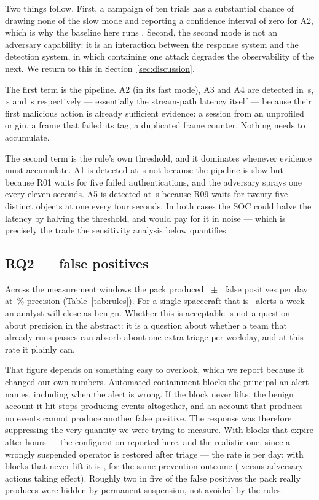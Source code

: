 Two things follow. First, a campaign of ten trials has a substantial chance of
drawing none of the slow mode and reporting a confidence interval of zero for A2,
which is why the baseline here runs \ResTrials{}. Second, the second mode is not
an adversary capability: it is an interaction between the response system and the
detection system, in which containing one attack degrades the observability of
the next. We return to this in Section~\ref{sec:discussion}.

The first term is the pipeline. A2 (in its fast mode), A3 and A4 are detected in
\ResTTDMedianAtwo{}\,s, \ResTTDAthree{}\,s and \ResTTDAfour{}\,s respectively ---
essentially the stream-path latency itself --- because their first malicious
action is already sufficient evidence: a session from an unprofiled origin, a
frame that failed its tag, a duplicated frame counter. Nothing needs to
accumulate.

The second term is the rule's own threshold, and it dominates whenever evidence
must accumulate. A1 is detected at \ResTTDAone{}\,s not because the pipeline is
slow but because R01 waits for five failed authentications, and the adversary
sprays one every eleven seconds. A5 is detected at \ResTTDAfive{}\,s because R09
waits for twenty-five distinct objects at one every four seconds. In both cases
the SOC could halve the latency by halving the threshold, and would pay for it in
noise --- which is precisely the trade the sensitivity analysis below quantifies.

\subsection{RQ2 --- false positives}

Across the measurement windows the pack produced
\ResFPDay{}~$\pm$~\ResFPDayCI{} false positives per day at \ResPrecision{}\,\%
precision (Table~\ref{tab:rules}). For a single spacecraft that is
\ResFPWeek{}~alerts a week an analyst will close as benign. Whether this is
acceptable is not a question about precision in the abstract: it is a question
about whether a team that already runs passes can absorb about one extra triage
per weekday, and at this rate it plainly can.

That figure depends on something easy to overlook, which we report because it
changed our own numbers. Automated containment blocks the principal an alert
names, including when the alert is wrong. If the block never lifts, the benign
account it hit stops producing events altogether, and an account that produces
no events cannot produce another false positive. The response was therefore
suppressing the very quantity we were trying to measure. With blocks that expire
after \BlockTTLHours{} hours --- the configuration reported here, and the
realistic one, since a wrongly suspended operator is restored after triage ---
the rate is \AblFullFP{} per day; with blocks that never lift it is
\AblNoExpiryFP{}, for the same prevention outcome (\AblNoExpirySucc{} versus
\AblFullSucc{} adversary actions taking effect). Roughly two in five of the
false positives the pack really produces were hidden by permanent suspension,
not avoided by the rules.

